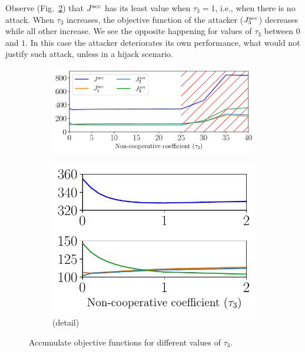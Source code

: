 \documentclass[../main.tex]{subfiles}
\begin{document}
Observe (Fig.~\ref{fig:example_vary_tau_objective_detail}) that $\Jacc$ has its least value when $\tau_{3}=1$, i.e., when there is no attack.
When $\tau_{3}$ increases, the objective function of the attacker ($\Jiacc[3]$) decreases while all other increase.
We see the opposite happening for values of $\tau_{3}$ between $0$ and $1$.
In this case the attacker deteriorates its own performance, what would not justify such attack, unless in a hijack scenario.

\begin{figure}[h]
  \centering
  \begin{subfigure}{0.50\textwidth}
    \includegraphics[width=\textwidth]{../img/example_primal_decomposition/example_vary_tau_J.pdf}
    \caption{}\label{fig:example_vary_tau_objective}
  \end{subfigure}
  \begin{subfigure}{0.3\textwidth}
    \includegraphics[width=\textwidth]{../img/example_primal_decomposition/example_vary_tau_J_detail.pdf}
    \caption{(detail)}\label{fig:example_vary_tau_objective_detail}
  \end{subfigure}
  \caption{Accumulate objective functions for different values of $\tau_{3}$.}\label{fig:example_vary_tau_objective_both}
\end{figure}
\end{document}
